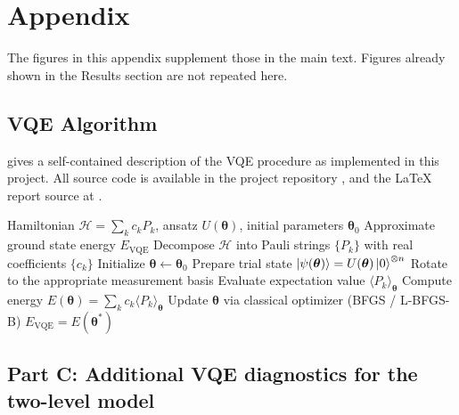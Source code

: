 \section{Appendix}\label{section:appendix}

The figures in this appendix supplement those in the main text. Figures already shown in the Results section are not repeated here.

\subsection*{VQE Algorithm}

 gives a self-contained description of the VQE procedure as implemented in this project. All source code is available in the project repository \parencite{fys5419-repo}, and the \LaTeX{} report source at \parencite{fys5419-overleaf}.

\begin{algorithm}[H]
\caption{Variational Quantum Eigensolver (VQE)}
\label{alg:vqe}
\begin{algorithmic}[1]
\Require Hamiltonian $\mathcal{H} = \sum_k c_k P_k$, ansatz $U(\boldsymbol{\theta})$, initial parameters $\boldsymbol{\theta}_0$
\Ensure Approximate ground state energy $E_{\mathrm{VQE}}$
\State Decompose $\mathcal{H}$ into Pauli strings $\{P_k\}$ with real coefficients $\{c_k\}$
\State Initialize $\boldsymbol{\theta} \leftarrow \boldsymbol{\theta}_0$
\Repeat
  \State Prepare trial state $\left| \psi(\boldsymbol{\theta}) \right\rangle = U(\boldsymbol{\theta})\left| 0 \right\rangle^{\otimes n}$
    \State Rotate to the appropriate measurement basis
    \State Evaluate expectation value $\langle P_k \rangle_{\boldsymbol{\theta}}$
  \EndFor
  \State Compute energy $E(\boldsymbol{\theta}) = \sum_k c_k \langle P_k \rangle_{\boldsymbol{\theta}}$
  \State Update $\boldsymbol{\theta}$ via classical optimizer (BFGS / L-BFGS-B)
\State \Return $E_{\mathrm{VQE}} = E(\boldsymbol{\theta}^{\ast})$
\end{algorithmic}
\end{algorithm}

\subsection*{Part C: Additional VQE diagnostics for the two-level model}


